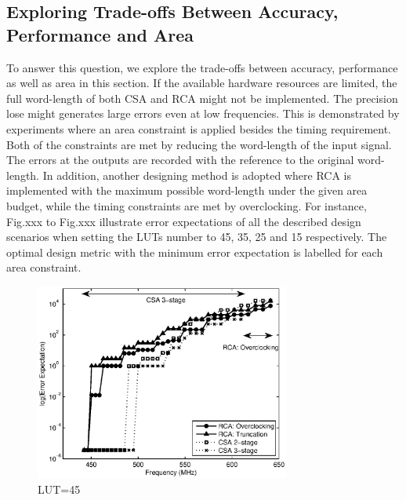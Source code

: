 \documentclass[journal]{IEEEtran}
\begin{document}
\subsection{Exploring Trade-offs Between Accuracy, Performance and Area}
To answer this question, we explore the trade-offs between accuracy, performance as well as area in this section. If the available hardware resources are limited, the full word-length of both CSA and RCA might not be implemented. The precision lose might generates large errors even at low frequencies. This is demonstrated by experiments where an area constraint is applied besides the timing requirement. Both of the constraints are met by reducing the word-length of the input signal. The errors at the outputs are recorded with the reference to the original word-length. In addition, another designing method is adopted where RCA is implemented with the maximum possible word-length under the given area budget, while the timing constraints are met by overclocking. For instance, Fig.xxx to Fig.xxx illustrate error expectations of all the described design scenarios when setting the LUTs number to 45, 35, 25 and 15 respectively. The optimal design metric with the minimum error expectation is labelled for each area constraint.
%
\begin{figure}[htbp]
	\centering
	\includegraphics[width=3.3in]{./Figures/Error_LUT45.eps}
	\caption{LUT=45}
\end{figure}
\end{document}
